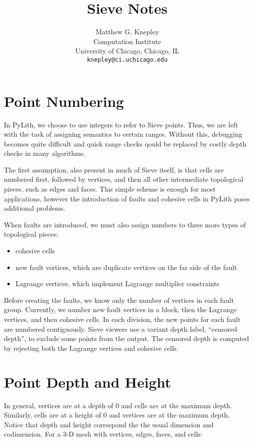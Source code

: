 \documentclass[12pt]{article}
\title{Sieve Notes}
\author{Matthew G. Knepley\\
\small Computation Institute\\[-0.8ex]
\small University of Chicago, Chicago, IL\\
\small \texttt{knepley@ci.uchicago.edu}\\
}
\begin{document}
\maketitle

\section{Point Numbering}

In PyLith, we choose to use integers to refer to Sieve points. Thus,
we are left with the task of assigning semantics to certain
ranges. Without this, debugging becomes quite difficult and quick
range checks qould be replaced by costly depth checks in many
algorithms.

The first assumption, also present in much of Sieve itself, is that
cells are numbered first, followed by vertices, and then all other
intermediate topological pieces, such as edges and faces. This simple
scheme is enough for most applications, however the introduction of
faults and cohesive cells in PyLith poses additional problems.

When faults are introduced, we must also assign numbers to three more
types of topological pieces:
\begin{itemize}
  \item cohesive cells
  \item new fault vertices, which are duplicate vertices on the far
    side of the fault
  \item Lagrange vertices, which implement Lagrange multiplier constraints
\end{itemize}
Before creating the faults, we know only the number of vertices in
each fault group. Currently, we number new fault vertices in a block,
then the Lagrange vertices, and then cohesive cells. In each division,
the new points for each fault are numbered contiguously. Sieve viewers
use a variant depth label, ``censored depth'', to exclude some points
from the output. The censored depth is computed by rejecting both the
Lagrange vertices and cohesive cells.

\section{Point Depth and Height}

In general, vertices are at a depth of 0 and cells are at the maximum
depth. Similarly, cells are at a height of 0 and vertices are at the
maximum depth. Notice that depth and height correspond the the usual
dimension and codimension. For a 3-D mesh with vertices, edges, faces,
and cells:
\end{document}
